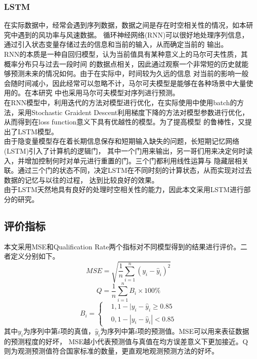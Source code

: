 \documentclass{ctexart}
\begin{document}
\subsubsection{LSTM}
在实际数据中，经常会遇到序列数据，数据之间是存在时空相关性的情况，如本研究中遇到的风功率与风速数据。
循环神经网络(RNN)可以很好地处理序列信息，通过引入状态变量存储过去的信息和当前的输入，从而确定当前的
输出。\\
\indent RNN的本质是一种自回归模型，认为当前值具有某种意义上的马尔可夫性质，其概率分布只与过去一段时间
的数据点相关，因此通过观察一个非常短的历史就能够预测未来的情况如何。由于在实际中，时间较为久远的信息
对当前的影响一般会随时间减小，因此经常可以忽略不计，马尔可夫模型是能够在各种场景中大量使用的。在本研究
中也采用马尔可夫模型对序列进行预测。\\
\indent 在RNN模型中，利用迭代的方法对模型进行优化，在实际使用中使用batch的方法，采用Stochastic Graident 
Descent利用梯度下降的方法对模型参数进行优化，从而得到在loss function意义下具有优越性的模型。为了提高模型
的鲁棒性，又提出了LSTM模型。\\
\indent 由于隐变量模型存在着长期信息保存和短期输入缺失的问题，长短期记忆网络(LSTM)引入了计算机的逻辑门，
其中一个门用来输出，另一哥们用来决定何时读入，并增加控制何时对单元进行重置的门。三个门都利用线性运算与
隐藏层相关联。通过三个门的状态不同，决定LSTM在不同时刻的计算状态，从而实现对过去数据的记忆与以往的过程，
达到比较良好的效果。\\
\indent 由于LSTM天然地具有良好的处理时空相关性的能力，因此本文采用LSTM进行部分的研究。
\subsection{评价指标}
本文采用MSE和Qualification Rate两个指标对不同模型得到的结果进行评价。二者定义分别如下。\\
\begin{equation}
    MSE = \sqrt{\frac{1}{n}\sum_{i=1}^n (y_i-\hat{y}_i)^2}
\end{equation}
\begin{equation}
    Q = \frac{1}{n}\sum_{i=1}^n B_i\times 100\%
\end{equation}
\begin{equation}
    B_i = \left\{
        \begin{aligned}
            &1, 1-|y_i-\hat{y}_i \geq 0.85\\
            &0, 1-|y_i-\hat{y}_i| < 0.85
        \end{aligned}
        \right .
\end{equation}
其中$y_i$为序列中第$i$项的真值，$\hat{y}_i$为序列中第$i$项的预测值。MSE可以用来表征数据的预测程度的好坏，
MSE越小代表预测值与真值在均方误差意义下更加接近。Q则为观测预测值符合国家标准的数量，更直观地观测预测方法的好坏。
\end{document}

